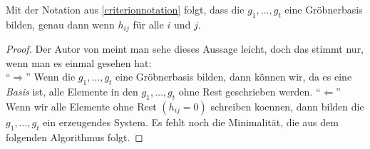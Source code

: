 \documentclass{article}
\begin{document}
	\begin{thm}
		Mit der Notation aus \ref{criterionnotation} folgt,
		dass die 
		\( g_{1},\dots,g_{t} \)
		eine Gr\"obnerbasis bilden,
		genau dann wenn 
		\( h_{ij} \)
		f\"ur alle 
		\( i \)
		und 
		\( j\).
		\begin{proof}
			Der Autor von \cite{Eis1} 
			meint man sehe dieses Aussage leicht, 
			doch das stimmt nur,
			wenn man es einmal gesehen hat:\\
			``\( \Rightarrow \)'' Wenn die 
			\( g_{1},\dots,g_{t} \) 
			eine Gr\"obnerbasis bilden,
			dann k\"onnen wir, 
			da es eine \emph{Basis} ist,
			alle Elemente in den 
			\( g_{1},\dots,g_{t} \)
			ohne Rest geschrieben werden.
			``\(\Leftarrow \)'' Wenn wir alle Elemente ohne Rest
			\( \left( h_{ij} = 0 \right) \)
			schreiben koennen, 
			dann bilden die 
			\( g_{1},\dots,g_{t} \)
			ein erzeugendes System.
			Es fehlt noch die Minimalit\"at,
			die aus dem folgenden Algorithmus folgt.
		\end{proof}
	\end{thm}
\end{document}
